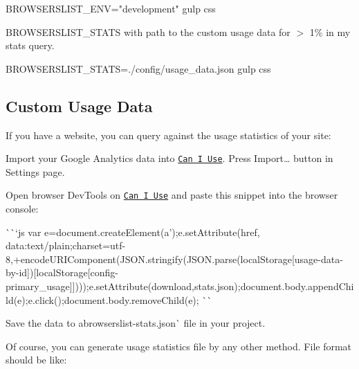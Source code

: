 \begin{DoxyCode}
BROWSERSLIST\_ENV="development" gulp css
\end{DoxyCode}



\begin{DoxyItemize}
\item {\ttfamily B\+R\+O\+W\+S\+E\+R\+S\+L\+I\+S\+T\+\_\+\+S\+T\+A\+TS} with path to the custom usage data for {\ttfamily $>$ 1\% in my stats} query.
\end{DoxyItemize}


\begin{DoxyCode}
BROWSERSLIST\_STATS=./config/usage\_data.json gulp css
\end{DoxyCode}


\subsection*{Custom Usage Data}

If you have a website, you can query against the usage statistics of your site\+:


\begin{DoxyEnumerate}
\item Import your Google Analytics data into \href{http://caniuse.com/}{\tt Can I Use}. Press {\ttfamily Import…} button in Settings page.
\item Open browser Dev\+Tools on \href{http://caniuse.com/}{\tt Can I Use} and paste this snippet into the browser console\+:

\`{}\`{}`js var e=document.\+create\+Element(\textquotesingle{}a');e.\+set\+Attribute(\textquotesingle{}href\textquotesingle{}, \textquotesingle{}data\+:text/plain;charset=utf-\/8,\textquotesingle{}+encode\+U\+R\+I\+Component(J\+S\+O\+N.\+stringify(J\+S\+O\+N.\+parse(local\+Storage\mbox{[}\textquotesingle{}usage-\/data-\/by-\/id\textquotesingle{}\mbox{]})\mbox{[}local\+Storage\mbox{[}\textquotesingle{}config-\/primary\+\_\+usage\textquotesingle{}\mbox{]}\mbox{]})));e.\+set\+Attribute(\textquotesingle{}download\textquotesingle{},\textquotesingle{}stats.\+json\textquotesingle{});document.\+body.\+append\+Child(e);e.\+click();document.\+body.\+remove\+Child(e); \`{}\`{}{\ttfamily }
\item {\ttfamily Save the data to a}browserslist-\/stats.\+json\`{} file in your project.
\end{DoxyEnumerate}

Of course, you can generate usage statistics file by any other method. File format should be like\+:



